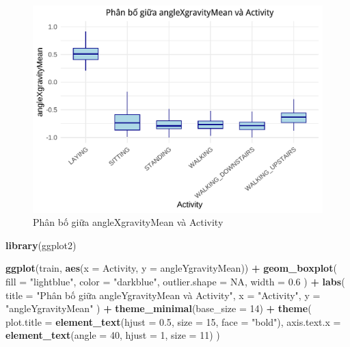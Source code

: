 \documentclass[
]{article}
\newenvironment{Shaded}{\begin{snugshade}}{\end{snugshade}}
\newcommand{\AttributeTok}[1]{\textcolor[rgb]{0.13,0.29,0.53}{#1}}
\newcommand{\ConstantTok}[1]{\textcolor[rgb]{0.56,0.35,0.01}{#1}}
\newcommand{\DecValTok}[1]{\textcolor[rgb]{0.00,0.00,0.81}{#1}}
\newcommand{\FloatTok}[1]{\textcolor[rgb]{0.00,0.00,0.81}{#1}}
\newcommand{\FunctionTok}[1]{\textcolor[rgb]{0.13,0.29,0.53}{\textbf{#1}}}
\newcommand{\NormalTok}[1]{#1}
\newcommand{\SpecialCharTok}[1]{\textcolor[rgb]{0.81,0.36,0.00}{\textbf{#1}}}
\newcommand{\StringTok}[1]{\textcolor[rgb]{0.31,0.60,0.02}{#1}}
\begin{document}
\begin{figure}
\centering
\includegraphics{report_files/figure-latex/unnamed-chunk-17-1.pdf}
\caption{Phân bố giữa angleXgravityMean và Activity}
\end{figure}

\begin{Shaded}
\begin{Highlighting}[]
\FunctionTok{library}\NormalTok{(ggplot2)}

\FunctionTok{ggplot}\NormalTok{(train, }\FunctionTok{aes}\NormalTok{(}\AttributeTok{x =}\NormalTok{ Activity, }\AttributeTok{y =}\NormalTok{ angleYgravityMean)) }\SpecialCharTok{+}
  \FunctionTok{geom\_boxplot}\NormalTok{(}
    \AttributeTok{fill =} \StringTok{"lightblue"}\NormalTok{,}
    \AttributeTok{color =} \StringTok{"darkblue"}\NormalTok{,}
    \AttributeTok{outlier.shape =} \ConstantTok{NA}\NormalTok{,}
    \AttributeTok{width =} \FloatTok{0.6}
\NormalTok{  ) }\SpecialCharTok{+}
  \FunctionTok{labs}\NormalTok{(}
    \AttributeTok{title =} \StringTok{"Phân bố giữa angleYgravityMean và Activity"}\NormalTok{,}
    \AttributeTok{x =} \StringTok{"Activity"}\NormalTok{,}
    \AttributeTok{y =} \StringTok{"angleYgravityMean"}
\NormalTok{  ) }\SpecialCharTok{+}
  \FunctionTok{theme\_minimal}\NormalTok{(}\AttributeTok{base\_size =} \DecValTok{14}\NormalTok{) }\SpecialCharTok{+}
  \FunctionTok{theme}\NormalTok{(}
    \AttributeTok{plot.title =} \FunctionTok{element\_text}\NormalTok{(}\AttributeTok{hjust =} \FloatTok{0.5}\NormalTok{, }\AttributeTok{size =} \DecValTok{15}\NormalTok{, }\AttributeTok{face =} \StringTok{"bold"}\NormalTok{),}
    \AttributeTok{axis.text.x =} \FunctionTok{element\_text}\NormalTok{(}\AttributeTok{angle =} \DecValTok{40}\NormalTok{, }\AttributeTok{hjust =} \DecValTok{1}\NormalTok{, }\AttributeTok{size =} \DecValTok{11}\NormalTok{)}
\NormalTok{  )}
\end{Highlighting}
\end{Shaded}
\end{document}
